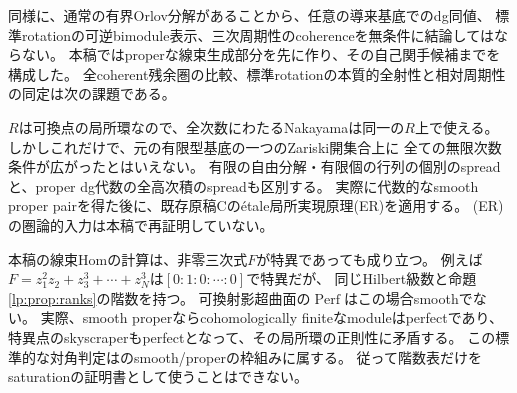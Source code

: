 同様に、通常の有界Orlov分解があることから、任意の導来基底でのdg同値、
標準rotationの可逆bimodule表示、三次周期性のcoherenceを無条件に結論してはならない。
本稿ではproperな線束生成部分を先に作り、その自己関手候補までを構成した。
全coherent残余圏の比較、標準rotationの本質的全射性と相対周期性の同定は次の課題である。

\begin{remark}[局所環と有限型開集合を区別する]
$R$は可換点の局所環なので、全次数にわたるNakayamaは同一の$R$上で使える。
しかしこれだけで、元の有限型基底の一つのZariski開集合上に
全ての無限次数条件が広がったとはいえない。
有限の自由分解・有限個の行列の個別のspreadと、proper dg代数の全高次積のspreadも区別する。
実際に代数的なsmooth proper pairを得た後に、既存原稿Cのétale局所実現原理(ER)を適用する。
(ER)の圏論的入力は本稿で再証明していない。
\end{remark}

\begin{remark}[同じHom階数でもsmoothとは限らない]
本稿の線束Homの計算は、非零三次式$F$が特異であっても成り立つ。
例えば$F=z_1^2z_2+z_3^3+\cdots+z_N^3$は$[0:1:0:\cdots:0]$で特異だが、
同じHilbert級数と命題\ref{lp:prop:ranks}の階数を持つ。
可換射影超曲面の$\operatorname{Perf}$はこの場合smoothでない。
実際、smooth properならcohomologically finiteなmoduleはperfectであり、
特異点のskyscraperもperfectとなって、その局所環の正則性に矛盾する。
この標準的な対角判定は\cite[Proposition 3.31]{LP-Orlov}のsmooth/properの枠組みに属する。
従って階数表だけをsaturationの証明書として使うことはできない。
\end{remark}